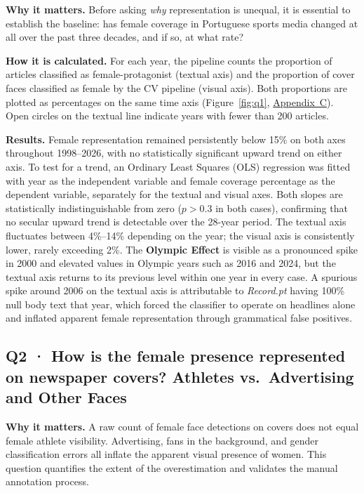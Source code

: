 \documentclass[11pt,a4paper]{article}
\begin{document}
\textbf{Why it matters.} Before asking \textit{why} representation is unequal, it is essential to establish the baseline: has female coverage in Portuguese sports media changed at all over the past three decades, and if so, at what rate?

\textbf{How it is calculated.} For each year, the pipeline counts the proportion of articles classified as female-protagonist (textual axis) and the proportion of cover faces classified as female by the CV pipeline (visual axis). Both proportions are plotted as percentages on the same time axis (Figure~\ref{fig:q1}, \hyperref[app:figures]{Appendix~C}). Open circles on the textual line indicate years with fewer than 200 articles.

\textbf{Results.} Female representation remained persistently below 15\% on both axes throughout 1998--2026, with no statistically significant upward trend on either axis. To test for a trend, an Ordinary Least Squares (OLS) regression was fitted with year as the independent variable and female coverage percentage as the dependent variable, separately for the textual and visual axes. Both slopes are statistically indistinguishable from zero ($p > 0.3$ in both cases), confirming that no secular upward trend is detectable over the 28-year period. The textual axis fluctuates between 4\%--14\% depending on the year; the visual axis is consistently lower, rarely exceeding 2\%. The \textbf{Olympic Effect} is visible as a pronounced spike in 2000 and elevated values in Olympic years such as 2016 and 2024, but the textual axis returns to its previous level within one year in every case. A spurious spike around 2006 on the textual axis is attributable to \textit{Record.pt} having 100\% null body text that year, which forced the classifier to operate on headlines alone and inflated apparent female representation through grammatical false positives.


\subsection[Q2 · Female presence on covers: Athletes vs.\ Advertising]{Q2 · How is the female presence represented on newspaper covers? Athletes vs.\ Advertising and Other Faces}
\label{sec:q2}

\textbf{Why it matters.} A raw count of female face detections on covers does not equal female athlete visibility. Advertising, fans in the background, and gender classification errors all inflate the apparent visual presence of women. This question quantifies the extent of the overestimation and validates the manual annotation process.
\end{document}
